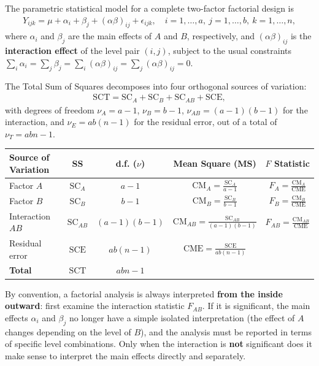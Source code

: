 The parametric statistical model for a complete two-factor factorial design is
\begin{align}
	Y_{ijk} = \mu + \alpha_i + \beta_j + (\alpha\beta)_{ij} + \epsilon_{ijk}, \quad i=1,\ldots,a,\ j=1,\ldots,b,\ k=1,\ldots,n,
	\label{eq:modelo_factorial}
\end{align}
where $\alpha_i$ and $\beta_j$ are the main effects of $A$ and $B$, respectively, and $(\alpha\beta)_{ij}$ is the \textbf{interaction effect} of the level pair $(i,j)$, subject to the usual constraints $\sum_i \alpha_i = \sum_j \beta_j = \sum_i (\alpha\beta)_{ij} = \sum_j (\alpha\beta)_{ij} = 0$.

\begin{teorema}
	The Total Sum of Squares decomposes into four orthogonal sources of variation:
	\begin{align}
		\text{SCT} = \text{SC}_A + \text{SC}_B + \text{SC}_{AB} + \text{SCE},
	\end{align}
	with degrees of freedom $\nu_A = a-1$, $\nu_B = b-1$, $\nu_{AB} = (a-1)(b-1)$ for the interaction, and $\nu_E = ab(n-1)$ for the residual error, out of a total of $\nu_T = abn - 1$.
\end{teorema}

\begin{center}
	\begin{tabular}{lcccc}
		\hline
		\textbf{Source of Variation} & \textbf{SS} & \textbf{d.f. ($\nu$)} & \textbf{Mean Square (MS)} & \textbf{$F$ Statistic} \\ \hline
		Factor $A$ & $\text{SC}_A$ & $a-1$ & $\text{CM}_A = \frac{\text{SC}_A}{a-1}$ & $F_A = \frac{\text{CM}_A}{\text{CME}}$ \\ [1ex]
		Factor $B$ & $\text{SC}_B$ & $b-1$ & $\text{CM}_B = \frac{\text{SC}_B}{b-1}$ & $F_B = \frac{\text{CM}_B}{\text{CME}}$ \\ [1ex]
		Interaction $AB$ & $\text{SC}_{AB}$ & $(a-1)(b-1)$ & $\text{CM}_{AB} = \frac{\text{SC}_{AB}}{(a-1)(b-1)}$ & $F_{AB} = \frac{\text{CM}_{AB}}{\text{CME}}$ \\ [1ex]
		Residual error & $\text{SCE}$ & $ab(n-1)$ & $\text{CME} = \frac{\text{SCE}}{ab(n-1)}$ & \\ [1ex] \hline
		\textbf{Total} & $\text{SCT}$ & $abn-1$ & & \\ \hline
	\end{tabular}
\end{center}

\begin{observacion}
	By convention, a factorial analysis is always interpreted \textbf{from the inside outward}: first examine the interaction statistic $F_{AB}$. If it is significant, the main effects $\alpha_i$ and $\beta_j$ no longer have a simple isolated interpretation (the effect of $A$ changes depending on the level of $B$), and the analysis must be reported in terms of specific level combinations. Only when the interaction is \textbf{not} significant does it make sense to interpret the main effects directly and separately.
\end{observacion}

